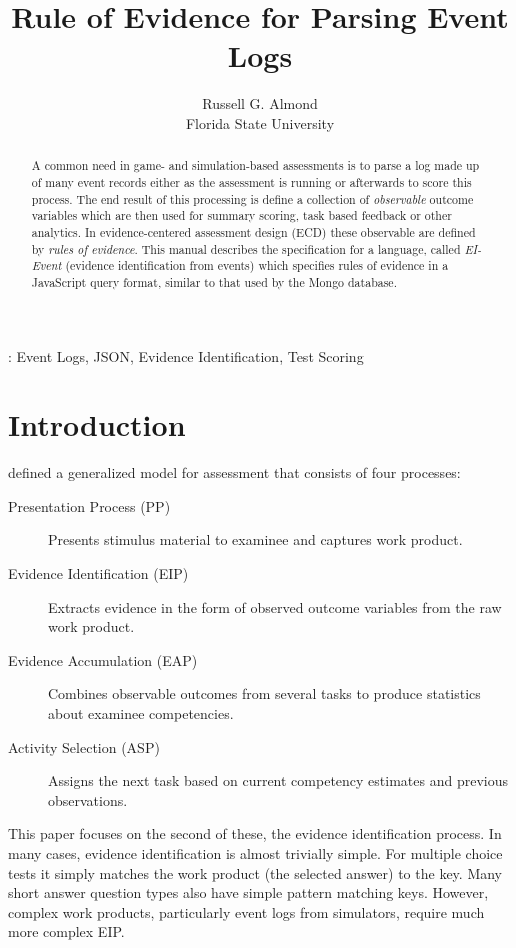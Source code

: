 \documentclass{article}
\title{\large{\bf Rule of Evidence for Parsing Event Logs}}
\author{Russell G. Almond\\ Florida State University\\ }
\begin{document}
  \maketitle
\begin{abstract}
A common need in game- and simulation-based assessments is to parse a
log made up of many event records either as the assessment is running
or afterwards to score this process.  The end result of this
processing is define a collection of \textit{observable} outcome
variables which are then used for summary scoring, task based feedback
or other analytics.  In evidence-centered assessment design (ECD)
these observable are defined by \textit{rules of evidence}.  This
manual describes the specification for a language, called
\textit{EI-Event} (evidence identification from events) which
specifies rules of evidence in a JavaScript query format, similar to
that used by the Mongo database.
\end{abstract}
\vspace{1cm} : Event Logs, JSON, Evidence
Identification, Test Scoring


  \section{Introduction}

   defined a generalized model for assessment that
  consists of four processes:
  \begin{description}
    \item[Presentation Process (PP)]{Presents stimulus material to examinee
      and captures work product.}
    \item[Evidence Identification (EIP)]{Extracts evidence in the form of
      observed outcome variables from the raw work product.}
    \item[Evidence Accumulation (EAP)]{Combines observable outcomes from
      several tasks to produce statistics about examinee
      competencies.}
    \item[Activity Selection (ASP)]{Assigns the next task based on current
      competency estimates and previous observations.}
  \end{description}
  This paper focuses on the second of these, the evidence
  identification process.  In many cases, evidence identification is
  almost trivially simple.  For multiple choice tests it simply
  matches the work product (the selected answer) to the key.  Many
  short answer question types also have simple pattern matching keys.
  However, complex work products, particularly event logs from
  simulators, require much more complex EIP.
\end{document}
